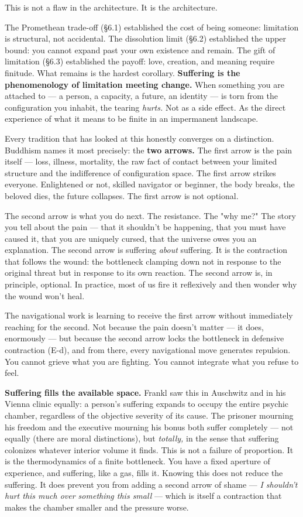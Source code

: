 This is not a flaw in the architecture. It is the architecture.


The Promethean trade-off (§6.1) established the cost of being someone: limitation is structural, not accidental. The dissolution limit (§6.2) established the upper bound: you cannot expand past your own existence and remain. The gift of limitation (§6.3) established the payoff: love, creation, and meaning require finitude. What remains is the hardest corollary. \textbf{Suffering is the phenomenology of limitation meeting change.} When something you are attached to — a person, a capacity, a future, an identity — is torn from the configuration you inhabit, the tearing \textit{hurts.} Not as a side effect. As the direct experience of what it means to be finite in an impermanent landscape.


Every tradition that has looked at this honestly converges on a distinction. Buddhism names it most precisely: the \textbf{two arrows.} The first arrow is the pain itself — loss, illness, mortality, the raw fact of contact between your limited structure and the indifference of configuration space. The first arrow strikes everyone. Enlightened or not, skilled navigator or beginner, the body breaks, the beloved dies, the future collapses. The first arrow is not optional.


The second arrow is what you do next. The resistance. The "why me?" The story you tell about the pain — that it shouldn't be happening, that you must have caused it, that you are uniquely cursed, that the universe owes you an explanation. The second arrow is suffering \textit{about} suffering. It is the contraction that follows the wound: the bottleneck clamping down not in response to the original threat but in response to its own reaction. The second arrow is, in principle, optional. In practice, most of us fire it reflexively and then wonder why the wound won't heal.


The navigational work is learning to receive the first arrow without immediately reaching for the second. Not because the pain doesn't matter — it does, enormously — but because the second arrow locks the bottleneck in defensive contraction (E-d), and from there, every navigational move generates repulsion. You cannot grieve what you are fighting. You cannot integrate what you refuse to feel.


\textbf{Suffering fills the available space.} Frankl saw this in Auschwitz and in his Vienna clinic equally: a person's suffering expands to occupy the entire psychic chamber, regardless of the objective severity of its cause. The prisoner mourning his freedom and the executive mourning his bonus both suffer completely — not equally (there are moral distinctions), but \textit{totally,} in the sense that suffering colonizes whatever interior volume it finds. This is not a failure of proportion. It is the thermodynamics of a finite bottleneck. You have a fixed aperture of experience, and suffering, like a gas, fills it. Knowing this does not reduce the suffering. It does prevent you from adding a second arrow of shame — \textit{I shouldn't hurt this much over something this small} — which is itself a contraction that makes the chamber smaller and the pressure worse.



